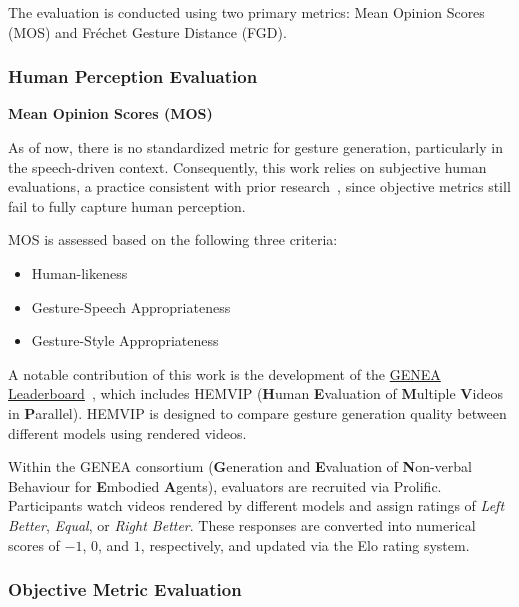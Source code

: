 The evaluation is conducted using two primary metrics: Mean Opinion Scores (MOS) and Fréchet Gesture Distance (FGD).

\subsubsection{Human Perception Evaluation}

\textbf{Mean Opinion Scores (MOS)}

As of now, there is no standardized metric for gesture generation, particularly in the speech-driven context. Consequently, this work relies on subjective human evaluations, a practice consistent with prior research~\cite{yoon2022genea, kucherenko2021large, alexanderson2022listen}, since objective metrics still fail to fully capture human perception.

MOS is assessed based on the following three criteria:

\begin{itemize}
	\item Human-likeness
	\item Gesture-Speech Appropriateness
	\item Gesture-Style Appropriateness
\end{itemize}

A notable contribution of this work is the development of the \hyperlink{https://genea-workshop.github.io/leaderboard/}{GENEA Leaderboard}~\cite{nagy2024towards}, which includes HEMVIP (\textbf{H}uman \textbf{E}valuation of \textbf{M}ultiple \textbf{V}ideos in \textbf{P}arallel). HEMVIP is designed to compare gesture generation quality between different models using rendered videos.

Within the GENEA consortium (\textbf{G}eneration and \textbf{E}valuation of \textbf{N}on-verbal Behaviour for \textbf{E}mbodied \textbf{A}gents), evaluators are recruited via Prolific. Participants watch videos rendered by different models and assign ratings of \textit{Left Better}, \textit{Equal}, or \textit{Right Better}. These responses are converted into numerical scores of $-1$, $0$, and $1$, respectively, and updated via the Elo rating system.


\subsubsection{Objective Metric Evaluation}

